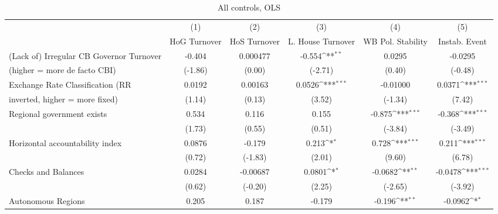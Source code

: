 \begin{table}[htbp]\centering
\def\sym#1{\ifmmode^{#1}\else\(^{#1}\)\fi}
\caption{All controls, OLS \label{fullcmultIndOLSDF}}
\begin{tabular}{l*{5}{c}}
\toprule
                                        &\multicolumn{1}{c}{(1)}&\multicolumn{1}{c}{(2)}&\multicolumn{1}{c}{(3)}&\multicolumn{1}{c}{(4)}&\multicolumn{1}{c}{(5)}\\
                                        &\multicolumn{1}{c}{HoG Turnover}&\multicolumn{1}{c}{HoS Turnover}&\multicolumn{1}{c}{L. House Turnover}&\multicolumn{1}{c}{WB Pol. Stability}&\multicolumn{1}{c}{Instab. Event}\\
\midrule
(Lack of) Irregular CB Governor Turnover&   -0.404         & 0.000477         &   -0.554\sym{**} &   0.0295         &  -0.0295         \\
(higher = more de facto CBI)            &  (-1.86)         &   (0.00)         &  (-2.71)         &   (0.40)         &  (-0.48)         \\
\addlinespace
Exchange Rate Classification (RR        &   0.0192         &  0.00163         &   0.0526\sym{***}& -0.01000         &   0.0371\sym{***}\\
inverted, higher = more fixed)          &   (1.14)         &   (0.13)         &   (3.52)         &  (-1.34)         &   (7.42)         \\
\addlinespace
Regional government exists              &    0.534         &    0.116         &    0.155         &   -0.875\sym{***}&   -0.368\sym{***}\\
                                        &   (1.73)         &   (0.55)         &   (0.51)         &  (-3.84)         &  (-3.49)         \\
\addlinespace
Horizontal accountability index         &   0.0876         &   -0.179         &    0.213\sym{*}  &    0.728\sym{***}&    0.211\sym{***}\\
                                        &   (0.72)         &  (-1.83)         &   (2.01)         &   (9.60)         &   (6.78)         \\
\addlinespace
Checks and Balances                     &   0.0284         & -0.00687         &   0.0801\sym{*}  &  -0.0682\sym{**} &  -0.0478\sym{***}\\
                                        &   (0.62)         &  (-0.20)         &   (2.25)         &  (-2.65)         &  (-3.92)         \\
\addlinespace
Autonomous Regions                      &    0.205         &    0.187         &   -0.179         &   -0.196\sym{**} &  -0.0962\sym{*}  \\

\end{tabular}
\end{table}
